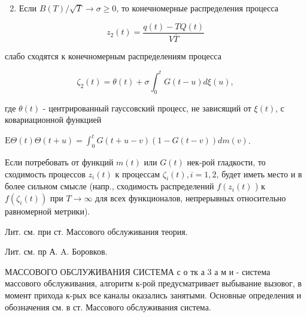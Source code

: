\documentclass[10pt]{article}
\begin{document}
\begin{enumerate}

  \setcounter{enumi}{1}

  \item Если $B(T) / \sqrt{T} \rightarrow \sigma \geqslant 0$, то конечномерные распределения процесса

\end{enumerate}



\[

z_{2}(t)=\frac{q(t)-T Q(t)}{V \bar{T}}

\]



слабо сходятся к конечномерным распределениям процесса



\[

\zeta_{2}(t)=\theta(t)+\sigma \int_{0}^{t} G(t-u) d \xi(u),

\]



где $\theta(t)$ - центрированный гауссовский процесс, не зависящий от $\xi(t)$, с ковариационной функцией



$\mathrm{E} \Theta(t) \Theta(t+u)=\int_{0}^{t} G(t+u-v)(1-G(t-v)) d m(v)$.



Если потребовать от функций $m(t)$ или $G(t)$ нек-рой гладкости, то сходимость процессов $z_{i}(t)$ к процессам $\zeta_{i}(t), i=1,2$, будет иметь место и в более сильном смысле (напр., сходимость распределений $f\left(z_{i}(t)\right.$ ) к $f\left(\zeta_{i}(t)\right)$ при $T \rightarrow \infty$ для всех функционалов, непрерывных относительно равномерной метрики).



Лит. см. при ст. Массового обслуживания теория.



Лит. см. пр А. A. Боровков.



МАССОВОГО ОБСЛУЖИВАНИЯ СИСТЕМА с $о$ тк а 3 а м и - система массового обслуживания, алгоритм к-рой предусматривает выбывание вызовог, в момент прихода к-рых все каналы оказались занятыми. Основные определения и обозначения см. в ст. Массового обслуживания система.
\end{document}
